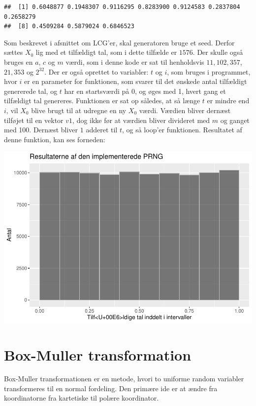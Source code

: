 \documentclass[
]{article}
\begin{document}
\begin{verbatim}
##  [1] 0.6048877 0.1948307 0.9116295 0.8283900 0.9124583 0.2837804 0.2658279
##  [8] 0.4509284 0.5879024 0.6846523
\end{verbatim}

Som beskrevet i afsnittet om LCG'er, skal generatoren bruge et seed.
Derfor sættes \(X_0\) lig med et tilfældigt tal, som i dette tilfælde er
\(1576\). Der skulle også bruges en \(a\), \(c\) og \(m\) værdi, som i
denne kode er sat til henholdsvis \(11,102,357\), \(21,353\) og
\(2^{32}\). Der er også oprettet to variabler: \(t\) og \(i\), som
bruges i programmet, hvor \(i\) er en parameter for funktionen, som
svarer til det ønskede antal tilfældigt genererede tal, og \(t\) har en
startsværdi på 0, og øges med 1, hvert gang et tilfældigt tal genereres.
Funktionen er sat op således, at så længe \(t\) er mindre end \(i\), vil
\(X_0\) blive brugt til at udregne en ny \(X_0\) værdi. Værdien bliver
dernæst tilføjet til en vektor \(v1\), dog ikke før at værdien bliver
divideret med \(m\) og ganget med 100. Dernæst bliver \(1\) adderet til
\(t\), og så loop'er funktionen. Resultatet af denne funktion, kan ses
forneden:

\includegraphics{TP2_files/figure-latex/Linear Congruence-1.pdf}

\hypertarget{box-muller-transformation}{%
\section{Box-Muller transformation}\label{box-muller-transformation}}

Box-Muller transformationen er en metode, hvori to uniforme random
variabler transformeres til en normal fordeling. Den primære ide er at
ændre fra koordinatorne fra kartetiske til polære koordinator.
\end{document}
